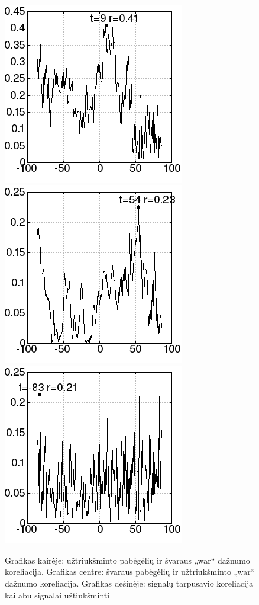 \begin{figure}
    \includegraphics[scale=0.65]{../scripts/refugees_war_rand/result_ref_rand.png}
    \includegraphics[scale=0.65]{../scripts/refugees_war_rand/result_war_rand.png}
    \includegraphics[scale=0.65]{../scripts/refugees_war_rand/result_both_rand.png}
    \caption{Grafikas kairėje: užtriukšminto pabėgėlių ir švaraus „war“ dažnumo koreliacija. Grafikas centre: švaraus pabėgėlių ir užtriukšminto „war“ dažnumo koreliacija. Grafikas dešinėje: signalų tarpusavio koreliacija kai abu signalai užtiukšminti}
    \label{fig:noisy_cross}
\end{figure}

